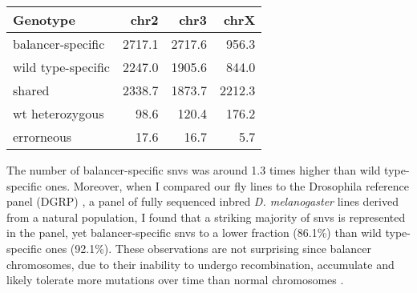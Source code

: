\begin{table}[ht]
    \centering
    \begin{tabu}{lrrr}
        \toprule
        Genotype & \ac{chr2} & \ac{chr3} & \ac{chrX} \\
        \midrule
        balancer-specific  & 2717.1 & 2717.6 &  956.3 \\
        wild type-specific & 2247.0 & 1905.6 &  844.0 \\
        shared             & 2338.7 & 1873.7 & 2212.3 \\
        wt heterozygous    &   98.6 &  120.4 &  176.2 \\
        errorneous         &   17.6 &   16.7 &    5.7 \\
        \bottomrule
    \end{tabu}
\end{table}

The number of balancer-specific \acp{snv} was around 1.3 times higher than wild
type-specific ones. Moreover, when I compared our fly lines to the Drosophila
reference panel (DGRP) \citep{Mackay2012,Huang2014}, a panel of fully sequenced
inbred \textit{D. melanogaster} lines derived from a natural population, I
found that a striking majority of \acp{snv} is represented in the panel, yet
balancer-specific \acp{snv} to a lower fraction (86.1\%) than wild type-specific
ones (92.1\%). These observations are not surprising since balancer chromosomes,
due to their inability to undergo recombination, accumulate and likely tolerate
more mutations over time than normal chromosomes \citep{Araye2013}.

